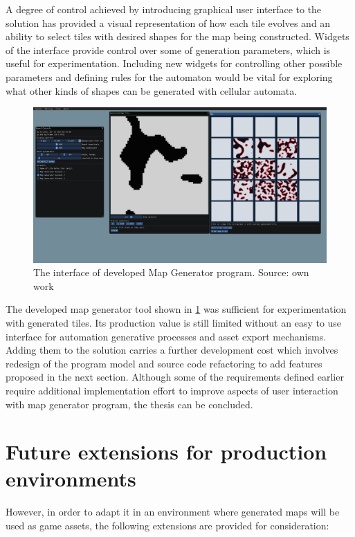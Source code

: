 \documentclass[12pt]{report}
\begin{document}
A degree of control achieved by introducing graphical user interface to the solution has provided a visual representation of how each tile evolves and an ability to select tiles with desired shapes for the map being constructed. Widgets of the interface provide control over some of generation parameters, which is useful for experimentation. Including new widgets for controlling other possible parameters and defining rules for the automaton would be vital for exploring what other kinds of shapes can be generated with cellular automata. 
 
\begin{figure}[h]
	\centering
	\includegraphics[width=\linewidth]{images/interface_mapgen}
	\caption{The interface of developed Map Generator program. Source: own work}
	\label{fig:interfacemapgen}
\end{figure}

The developed map generator tool shown in \cref{fig:interfacemapgen} was sufficient for experimentation with generated tiles. Its production value is still limited without an easy to use interface for automation generative processes and asset export mechanisms. Adding them to the solution carries a further development cost which involves redesign of the program model and source code refactoring to add features proposed in the next section. Although some of the requirements defined earlier require additional implementation effort to improve aspects of user interaction with map generator program, the thesis can be concluded. 

\section{Future extensions for production environments}

However, in order to adapt it in an environment where generated maps will be used as game assets, the following extensions are provided for consideration:
\end{document}
